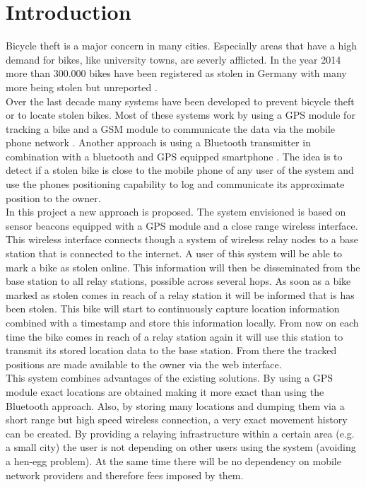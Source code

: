 \documentclass[a4paper]{article}
\begin{document}
\section{Introduction}
Bicycle theft is a major concern in many cities. Especially areas that have a high demand for bikes, like university towns, are severly afflicted. In the year 2014 more than 300.000 bikes have been registered as stolen in Germany with many more being stolen but unreported \cite{bka}.\\
Over the last decade many systems have been developed to prevent bicycle theft or to locate stolen bikes. Most of these systems work by using a GPS module for tracking a bike and a GSM module to communicate the data via the mobile phone network \cite{spybike,golembike}. Another approach is using a Bluetooth transmitter in combination with a bluetooth and GPS equipped smartphone \cite{leash}. The idea is to detect if a stolen bike is close to the mobile phone of any user of the system and use the phones positioning capability to log and communicate its approximate position to the owner.\\
In this project a new approach is proposed. The system envisioned is based on sensor beacons equipped with a GPS module and a close range wireless interface. This wireless interface connects though a system of wireless relay nodes to a base station that is connected to the internet. A user of this system will be able to mark a bike as stolen online. This information will then be disseminated from the base station to all relay stations, possible across several hops. As soon as a bike marked as stolen comes in reach of a relay station it will be informed that is has been stolen. This bike will start to continuously capture location information combined with a timestamp and store this information locally. From now on each time the bike comes in reach of a relay station again it will use this station to transmit its stored location data to the base station. From there the tracked positions are made available to the owner via the web interface.\\
This system combines advantages of the existing solutions. By using a GPS module exact locations are obtained making it more exact than using the Bluetooth approach. Also, by storing many locations and dumping them via a short range but high speed wireless connection, a very exact movement history can be created. By providing a relaying infrastructure within a certain area (e.g. a small city) the user is not depending on other users using the system (avoiding a hen-egg problem). At the same time there will be no dependency on mobile network providers and therefore fees imposed by them.\\
\end{document}
